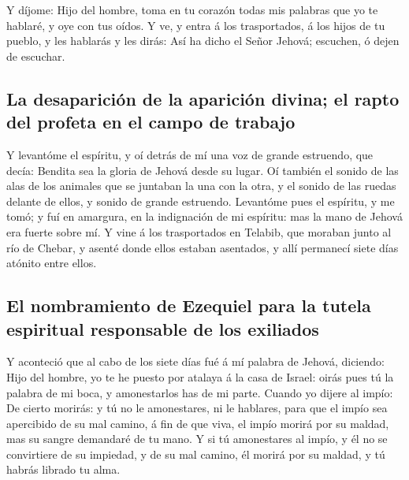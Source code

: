  Y díjome: Hijo del hombre, toma en tu corazón todas mis
palabras que yo te hablaré, y oye con tus oídos.  Y ve, y
entra á los trasportados, á los hijos de tu pueblo, y les hablarás y les
dirás: Así ha dicho el Señor Jehová; escuchen, ó dejen de escuchar.

\hypertarget{la-desapariciuxf3n-de-la-apariciuxf3n-divina-el-rapto-del-profeta-en-el-campo-de-trabajo}{%
\subsection{La desaparición de la aparición divina; el rapto del profeta
en el campo de
trabajo}\label{la-desapariciuxf3n-de-la-apariciuxf3n-divina-el-rapto-del-profeta-en-el-campo-de-trabajo}}

 Y levantóme el espíritu, y oí detrás de mí una voz de
grande estruendo, que decía: Bendita sea la gloria de Jehová desde su
lugar.  Oí también el sonido de las alas de los animales
que se juntaban la una con la otra, y el sonido de las ruedas delante de
ellos, y sonido de grande estruendo.  Levantóme pues el
espíritu, y me tomó; y fuí en amargura, en la indignación de mi
espíritu: mas la mano de Jehová era fuerte sobre mí.  Y
vine á los trasportados en Telabib, que moraban junto al río de Chebar,
y asenté donde ellos estaban asentados, y allí permanecí siete días
atónito entre ellos.

\hypertarget{el-nombramiento-de-ezequiel-para-la-tutela-espiritual-responsable-de-los-exiliados}{%
\subsection{El nombramiento de Ezequiel para la tutela espiritual
responsable de los
exiliados}\label{el-nombramiento-de-ezequiel-para-la-tutela-espiritual-responsable-de-los-exiliados}}

 Y aconteció que al cabo de los siete días fué á mí
palabra de Jehová, diciendo:  Hijo del hombre, yo te he
puesto por atalaya á la casa de Israel: oirás pues tú la palabra de mi
boca, y amonestarlos has de mi parte.  Cuando yo dijere
al impío: De cierto morirás: y tú no le amonestares, ni le hablares,
para que el impío sea apercibido de su mal camino, á fin de que viva, el
impío morirá por su maldad, mas su sangre demandaré de tu mano.
 Y si tú amonestares al impío, y él no se convirtiere de
su impiedad, y de su mal camino, él morirá por su maldad, y tú habrás
librado tu alma.

